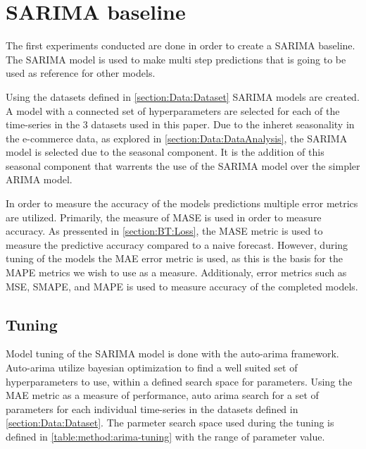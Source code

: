 
\section{SARIMA baseline}
\label{section:Method:SARIMA}

The first experiments conducted are done in order to create a SARIMA baseline.
The SARIMA model is used to make multi step predictions that is going to be used as reference for other models.

Using the datasets defined in \cref{section:Data:Dataset} SARIMA models are created.
A model with a connected set of hyperparameters are selected for each of the time-series in the 3 datasets used in this paper.
Due to the inheret seasonality in the e-commerce data, as explored in \cref{section:Data:DataAnalysis},
the SARIMA model is selected due to the seasonal component.
It is the addition of this seasonal component that warrents the use of the SARIMA model over the simpler ARIMA model.

In order to measure the accuracy of the models predictions multiple error metrics are utilized.
Primarily, the measure of MASE is used in order to measure accuracy.
As pressented in \cref{section:BT:Loss}, the MASE metric is used to measure the predictive accuracy
compared to a naive forecast.
However, during tuning of the models the MAE error metric is used, as this is the basis for the MAPE metrics we wish to use as a measure.
Additionaly, error metrics such as MSE, SMAPE, and MAPE is used to measure accuracy of the completed models.

\subsection{Tuning}
Model tuning of the SARIMA model is done with the auto-arima framework.
Auto-arima utilize bayesian optimization to find a well suited set of hyperparameters to use,
within a defined search space for parameters.
Using the MAE metric as a measure of performance, auto arima search for a set of parameters for each individual time-series
in the datasets defined in \cref{section:Data:Dataset}.
The parmeter search space used during the tuning is defined in \cref{table:method:arima-tuning} with the range of parameter value.

